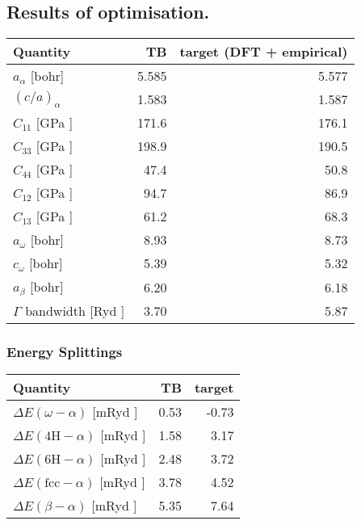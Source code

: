 \documentclass[11pt]{article}
\begin{document}
\subsection*{Results of optimisation.}
\label{sec:orgbadaea0}
\begin{center}
\begin{tabular}{lrr}
\hline
Quantity & TB & target (DFT + empirical)\\
\hline
\(a_{\alpha}\)              [bohr] & 5.585 & 5.577\\
\((c/a)_{\alpha}\) & 1.583 & 1.587\\
\(C_{11}\)                  [GPa ] & 171.6 & 176.1\\
\(C_{33}\)                  [GPa ] & 198.9 & 190.5\\
\(C_{44}\)                  [GPa ] & 47.4 & 50.8\\
\(C_{12}\)                  [GPa ] & 94.7 & 86.9\\
\(C_{13}\)                  [GPa ] & 61.2 & 68.3\\
\(a_{\omega}\)              [bohr] & 8.93 & 8.73\\
\(c_{\omega}\)              [bohr] & 5.39 & 5.32\\
\(a_{\beta}\)               [bohr] & 6.20 & 6.18\\
\(\Gamma\) bandwidth                 [Ryd ] & 3.70 & 5.87\\
\hline
\end{tabular}
\end{center}

\subsubsection*{Energy Splittings}
\label{sec:org3505e09}

\begin{center}
\begin{tabular}{lrr}
\hline
Quantity & TB & target\\
\hline
\(\Delta E(\omega-\alpha)\)     [mRyd ] & 0.53 & -0.73\\
\(\Delta E(\text{4H}-\alpha)\)  [mRyd ] & 1.58 & 3.17\\
\(\Delta E(\text{6H}-\alpha)\)  [mRyd ] & 2.48 & 3.72\\
\(\Delta E(\text{fcc}-\alpha)\) [mRyd ] & 3.78 & 4.52\\
\(\Delta E(\beta-\alpha)\)      [mRyd ] & 5.35 & 7.64\\
\hline
\end{tabular}
\end{center}
\end{document}
